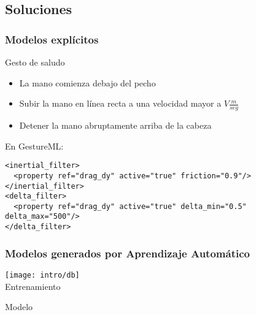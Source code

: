 \subsection{Soluciones}


\begin{frame}[fragile]
\frametitle{Modelos explícitos}
  
\begin{exampleblock}{Gesto de saludo}
    \begin{itemize}
          \item La mano comienza debajo del pecho
          \item Subir la mano en línea recta a una velocidad mayor a $V \frac{m}{seg}$
          \item Detener la mano abruptamente arriba de la cabeza
    \end{itemize}      
\end{exampleblock}

\begin{exampleblock}{En GestureML:}
\lstset{breaklines=true,language=XML, tabsize=12}
\begin{center}
\scriptsize
\begin{lstlisting}
<inertial_filter>
  <property ref="drag_dy" active="true" friction="0.9"/>
</inertial_filter>
<delta_filter>
  <property ref="drag_dy" active="true" delta_min="0.5" delta_max="500"/>
</delta_filter>
\end{lstlisting}
\end{center}
\end{exampleblock}
\end{frame}

\begin{myframe}
\frametitle{Modelos generados por Aprendizaje Automático}
\begin{center}
\texttt{[image: intro/db]}\\
\vspace{15pt}
\arrowdown Entrenamiento \arrowdown \\
\begin{varblock}[3cm]{}
\centering
\huge Modelo
\end{varblock}
\end{center}
\end{myframe}

